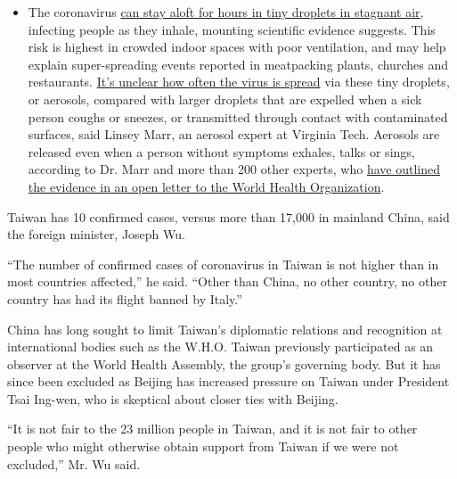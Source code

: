 \begin{itemize}
  \begin{itemize}
  \tightlist
  \item
    The coronavirus
    \href{https://www.nytimes.com/2020/07/04/health/239-experts-with-one-big-claim-the-coronavirus-is-airborne.html?action=click\&pgtype=Article\&state=default\&region=MAIN_CONTENT_3\&context=storylines_faq}{can
    stay aloft for hours in tiny droplets in stagnant air}, infecting
    people as they inhale, mounting scientific evidence suggests. This
    risk is highest in crowded indoor spaces with poor ventilation, and
    may help explain super-spreading events reported in meatpacking
    plants, churches and restaurants.
    \href{https://www.nytimes.com/2020/07/06/health/coronavirus-airborne-aerosols.html?action=click\&pgtype=Article\&state=default\&region=MAIN_CONTENT_3\&context=storylines_faq}{It's
    unclear how often the virus is spread} via these tiny droplets, or
    aerosols, compared with larger droplets that are expelled when a
    sick person coughs or sneezes, or transmitted through contact with
    contaminated surfaces, said Linsey Marr, an aerosol expert at
    Virginia Tech. Aerosols are released even when a person without
    symptoms exhales, talks or sings, according to Dr. Marr and more
    than 200 other experts, who
    \href{https://academic.oup.com/cid/article/doi/10.1093/cid/ciaa939/5867798}{have
    outlined the evidence in an open letter to the World Health
    Organization}.
  \end{itemize}
\end{itemize}

Taiwan has 10 confirmed cases, versus more than 17,000 in mainland
China, said the foreign minister, Joseph Wu.

``The number of confirmed cases of coronavirus in Taiwan is not higher
than in most countries affected,'' he said. ``Other than China, no other
country, no other country has had its flight banned by Italy.''

China has long sought to limit Taiwan's diplomatic relations and
recognition at international bodies such as the W.H.O. Taiwan previously
participated as an observer at the World Health Assembly, the group's
governing body. But it has since been excluded as Beijing has increased
pressure on Taiwan under President Tsai Ing-wen, who is skeptical about
closer ties with Beijing.

``It is not fair to the 23 million people in Taiwan, and it is not fair
to other people who might otherwise obtain support from Taiwan if we
were not excluded,'' Mr. Wu said.

